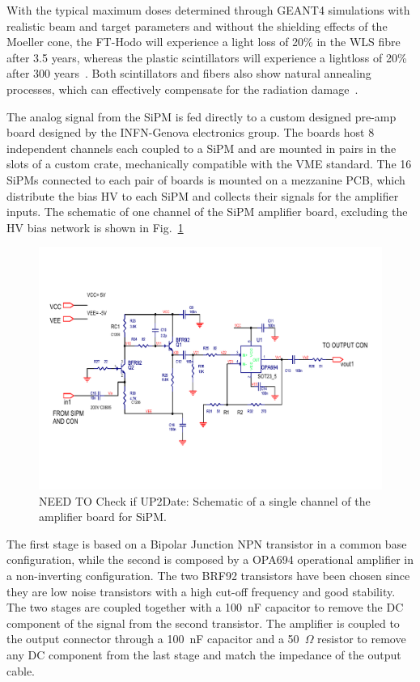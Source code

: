 With the typical maximum doses determined through GEANT4 simulations with realistic beam and target parameters and without the shielding effects of the Moeller cone, the FT-Hodo will experience a light loss of 20\% in the WLS fibre ~\cite{TDR42} after 3.5 years, whereas the plastic scintillators will experience a lightloss of 20\% after 300 years~\cite{TDR41}. Both scintillators and fibers also show natural annealing processes, which can effectively compensate for the radiation damage~\cite{TDR43}.  

The analog signal from the SiPM is fed directly to a custom designed pre-amp board designed by the INFN-Genova electronics group. The boards host 8 independent channels each coupled to a SiPM and are mounted in pairs in the slots of a custom crate, mechanically compatible with the VME standard. The 16 SiPMs connected to each pair of boards is mounted on a mezzanine PCB, which distribute the bias HV to each SiPM and collects their signals for the amplifier inputs. The schematic of one channel of the SiPM amplifier board, excluding the HV bias network is shown in Fig.~\ref{Fig:FTHODOAmpBoard}  
\begin{figure}[th!]
\centering 
\includegraphics[width=0.95\columnwidth]{./fig/FTHODOAmpBoard.pdf} 
\caption{NEED TO Check if UP2Date: Schematic of a single channel of the amplifier board for SiPM.} 
\label{Fig:FTHODOAmpBoard} 
\end{figure}
The first stage is based on a Bipolar Junction NPN transistor in a common base configuration, while the second is composed by a OPA694 operational amplifier in a non-inverting configuration. The two BRF92 transistors have been chosen since they are low noise transistors with a high cut-off frequency and good stability. The two stages are coupled together with a 100~nF capacitor to remove the DC component of the signal from the second transistor. The amplifier is coupled to the output connector through a 100~nF capacitor and a 50~$\Omega$ resistor to remove any DC component from the last stage and match the impedance of the output cable. 



